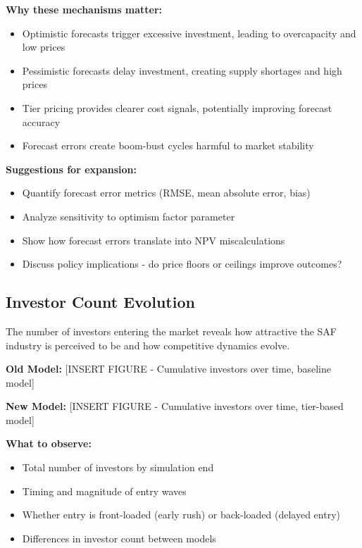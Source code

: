 \documentclass[10.5pt]{article}
\begin{document}
\textbf{Why these mechanisms matter:}
\begin{itemize}
    \item Optimistic forecasts trigger excessive investment, leading to overcapacity and low prices
    \item Pessimistic forecasts delay investment, creating supply shortages and high prices
    \item Tier pricing provides clearer cost signals, potentially improving forecast accuracy
    \item Forecast errors create boom-bust cycles harmful to market stability
\end{itemize}

\textbf{Suggestions for expansion:}
\begin{itemize}
    \item Quantify forecast error metrics (RMSE, mean absolute error, bias)
    \item Analyze sensitivity to optimism factor parameter
    \item Show how forecast errors translate into NPV miscalculations
    \item Discuss policy implications - do price floors or ceilings improve outcomes?
\end{itemize}

\subsection{Investor Count Evolution}

The number of investors entering the market reveals how attractive the SAF industry is perceived to be and how competitive dynamics evolve.

\textbf{Old Model:} [INSERT FIGURE - Cumulative investors over time, baseline model]

\textbf{New Model:} [INSERT FIGURE - Cumulative investors over time, tier-based model]

\textbf{What to observe:}
\begin{itemize}
    \item Total number of investors by simulation end
    \item Timing and magnitude of entry waves
    \item Whether entry is front-loaded (early rush) or back-loaded (delayed entry)
    \item Differences in investor count between models
\end{itemize}
\end{document}
